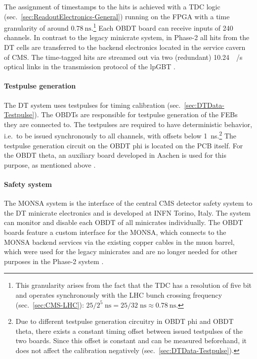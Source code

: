 \par The assignment of timestamps to the hits is achieved with a \ac{TDC} logic (sec.\ \ref{sec:ReadoutElectronics-General}) running on the \ac{FPGA} with a time granularity of around $\SI{0.78}{\nano\second}$.\footnote{This granularity arises from the fact that the \ac{TDC} has a resolution of five bit and operates synchronously with the \ac{LHC} bunch crossing frequency (sec.\ \ref{sec:CMS-LHC}): $25/2^5\;\si{\nano\second}=25/32\;\si{\nano\second}\approx\SI{0.78}{\nano\second}$.} Each \ac{OBDT} board can receive inputs of 240 channels. In contrast to the legacy minicrate system, in Phase-2 all hits from the \ac{DT} cells are transferred to the backend electronics located in the service cavern of \ac{CMS}. The time-tagged hits are streamed out via two (redundant) \SI{10.24}{\giga\bit/\second} optical links in the transmission protocol of the \ac{lpGBT} \cite{CMS-Phase2Muon,CMS-Phase2}.
\paragraph{Testpulse generation}
The \ac{DT} system uses testpulses for timing calibration (sec.\ \ref{sec:DTData-Testpulse}). The \acp{OBDT} are responsible for testpulse generation of the \acp{FEB} they are connected to. The testpulses are required to have deterministic behavior, i.e.\ to be issued synchronously to all channels, with offsets below \SI{1}{\nano\second}.\footnote{Due to different testpulse generation circuitry in \ac{OBDT} phi and \ac{OBDT} theta, there exists a constant timing offset between issued testpulses of the two boards. Since this offset is constant and can be measured beforehand, it does not affect the calibration negatively (sec.\ \ref{sec:DTData-Testpulse}).} The testpulse generation circuit on the \ac{OBDT} phi is located on the \ac{PCB} itself. For the \ac{OBDT} theta, an auxiliary board developed in Aachen is used for this purpose, as mentioned above \cite{DT-Phase2Upgrade}.
\paragraph{Safety system}
The \ac{MONSA} system is the interface of the central \ac{CMS} detector safety system to the \ac{DT} minicrate electronics and is developed at \ac{INFN} Torino, Italy. The system can monitor and disable each \ac{OBDT} of all minicrates individually. The \ac{OBDT} boards feature a custom interface for the \ac{MONSA}, which connects to the \ac{MONSA} backend services via the existing copper cables in the muon barrel, which were used for the legacy minicrates and are no longer needed for other purposes in the Phase-2 system \cite{DT-Phase2Upgrade}.
